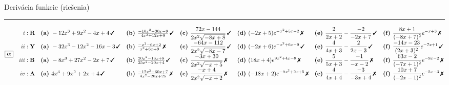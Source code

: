 \documentclass[10pt]{report}
\begin{document}
\newpage
\begin{landscape}
\begin{center}
{\huge Derivácia funkcie (riešenia)}\\[4mm]
\begin{varwidth}{\linewidth}
\begin{center}
\tiny
\rule[1mm]{\linewidth}{0.5pt}
$\boxed{\bm{\alpha}} \quad \begin{aligned}
\romannumeral1 : \; &\textbf{R} 
 &&\mathrm{\textbf{(a) }} -12x^3+9x^2-4x+4\,\text{\ding{51}}
 &&\mathrm{\textbf{(b) }} \tfrac{-10x^2-30x-9}{4x^2+12x+9}\,\text{\ding{51}}
 &&\mathrm{\textbf{(c) }} \frac{72x-144}{2x^2 \sqrt{\smash[b]{-8x+8}}}\,\text{\ding{51}}
 &&\mathrm{\textbf{(d) }} (-2x+5)e^{-x^2+5x-2}\,\text{\ding{55}}
 &&\mathrm{\textbf{(e) }} \frac{2}{2x+2}-\frac{-2}{-2x+7}\,\text{\ding{51}}
 &&\mathrm{\textbf{(f) }} \frac{8x+1}{(-8x+7)^2}e^{-x+3}\,\text{\ding{55}}
\\[-1.0mm]
\romannumeral2 : \; &\textbf{Y} 
 &&\mathrm{\textbf{(a) }} -32x^3-12x^2-16x-3\,\text{\ding{51}}
 &&\mathrm{\textbf{(b) }} \tfrac{-x^2-6x+2}{x^2+6x+9}\,\text{\ding{55}}
 &&\mathrm{\textbf{(c) }} \frac{-64x-112}{2x^2 \sqrt{\smash[b]{-8x-7}}}\,\text{\ding{51}}
 &&\mathrm{\textbf{(d) }} (-2x+6)e^{-x^2+6x-9}\,\text{\ding{51}}
 &&\mathrm{\textbf{(e) }} \frac{4}{4x+3}-\frac{2}{2x-3}\,\text{\ding{51}}
 &&\mathrm{\textbf{(f) }} \frac{-14x-23}{(2x+3)^2}e^{-7x+1}\,\text{\ding{51}}
\\[-1.0mm]
\romannumeral3 : \; &\textbf{B} 
 &&\mathrm{\textbf{(a) }} -8x^3+27x^2-2x+7\,\text{\ding{51}}
 &&\mathrm{\textbf{(b) }} \tfrac{20x^2-16x+8}{25x^2-20x+4}\,\text{\ding{51}}
 &&\mathrm{\textbf{(c) }} \frac{-3x+30}{2x^2 \sqrt{\smash[b]{-x+5}}}\,\text{\ding{55}}
 &&\mathrm{\textbf{(d) }} (18x+4)e^{9x^2+4x-8}\,\text{\ding{55}}
 &&\mathrm{\textbf{(e) }} \frac{5}{5x+3}-\frac{-1}{-x-2}\,\text{\ding{55}}
 &&\mathrm{\textbf{(f) }} \frac{63x-2}{(-7x+1)^2}e^{-9x-2}\,\text{\ding{55}}
\\[-1.0mm]
\romannumeral4 : \; &\textbf{A} 
 &&\mathrm{\textbf{(a) }} 4x^3+9x^2+2x+4\,\text{\ding{51}}
 &&\mathrm{\textbf{(b) }} \tfrac{-12x^2+60x+7}{4x^2-20x+25}\,\text{\ding{55}}
 &&\mathrm{\textbf{(c) }} \frac{-x+4}{2x^2 \sqrt{\smash[b]{-x+2}}}\,\text{\ding{55}}
 &&\mathrm{\textbf{(d) }} (-18x+2)e^{-9x^2+2x+5}\,\text{\ding{55}}
 &&\mathrm{\textbf{(e) }} \frac{4}{4x+4}-\frac{-3}{-3x+4}\,\text{\ding{55}}
 &&\mathrm{\textbf{(f) }} \frac{10x+7}{(-2x-1)^2}e^{-5x-3}\,\text{\ding{55}}
\end{aligned} $

\end{center}
\end{varwidth}
\end{center}
\end{landscape}
\end{document}
